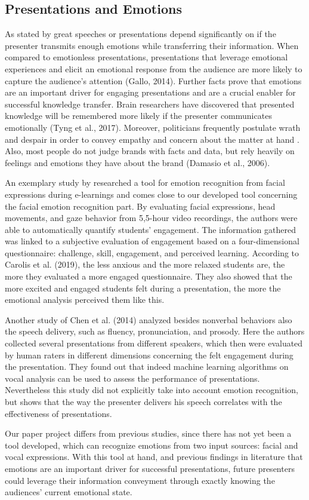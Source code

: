 \subsection{Presentations and Emotions}
\label{subsec:related_work_presentations_and_emotions}
As stated by  great speeches or presentations depend significantly on if the presenter transmits enough emotions while transferring their information. When compared to emotionless presentations, presentations that leverage emotional experiences and elicit an emotional response from the audience are more likely to capture the audience's attention (Gallo, 2014). Further facts prove that emotions are an important driver for engaging presentations and are a crucial enabler for successful knowledge transfer. Brain researchers have discovered that presented knowledge will be remembered more likely if the presenter communicates emotionally (Tyng et al., 2017). Moreover, politicians frequently postulate wrath and despair in order to convey empathy and concern about the matter at hand \cite{derrico_tracking_2019}. Also, most people do not judge brands with facts and data, but rely heavily on feelings and emotions they have about the brand (Damasio et al., 2006).

An exemplary study by  researched a tool for emotion recognition from facial expressions during e-learnings and comes close to our developed tool concerning the facial emotion recognition part. By evaluating facial expressions, head movements, and gaze behavior from 5,5-hour video recordings, the authors were able to automatically quantify students’ engagement. The information gathered was linked to a subjective evaluation of engagement based on a four-dimensional questionnaire: challenge, skill, engagement, and perceived learning. According to Carolis et al. (2019), the less anxious and the more relaxed students are, the more they evaluated a more engaged questionnaire. They also showed that the more excited and engaged students felt during a presentation, the more the emotional analysis perceived them like this.

Another study of Chen et al. (2014) analyzed besides nonverbal behaviors also the speech delivery, such as fluency, pronunciation, and prosody. Here the authors collected several presentations from different speakers, which then were evaluated by human raters in different dimensions concerning the felt engagement during the presentation. They found out that indeed machine learning algorithms on vocal analysis can be used to assess the performance of presentations. Nevertheless this study did not explicitly take into account emotion recognition, but shows that the way the presenter delivers his speech correlates with the effectiveness of presentations.

Our paper project differs from previous studies, since there has not yet been a tool developed, which can recognize emotions from two input sources: facial and vocal expressions. With this tool at hand, and previous findings in literature that emotions are an important driver for successful presentations, future presenters could leverage their information conveyment through exactly knowing the audiences’ current emotional state.
